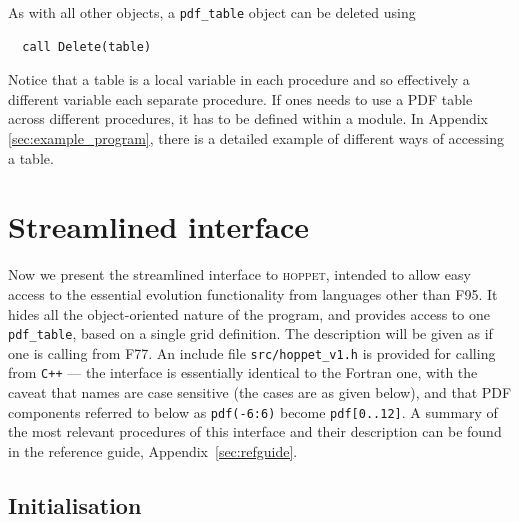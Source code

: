 \documentclass[12pt]{article}
\newcommand{\hoppet}{\textsc{hoppet}\xspace}
\newcommand{\ttt}[1]{\texttt{#1}}
\begin{document}
As with all other objects, a \ttt{pdf\_table} object can be deleted
using
\begin{lstlisting}
  call Delete(table) 
\end{lstlisting}
Notice that a table is a local variable in each procedure and so 
effectively a different variable each separate
procedure. 
%
If ones needs to use a 
PDF table across different procedures, it has to be 
defined within a module.
In Appendix \ref{sec:example_program}, 
there is a detailed example of different ways of
accessing a table. 






\section{Streamlined interface}
\label{sec:vanilla}

Now we present the streamlined interface to \hoppet,
intended to allow easy access
to the essential evolution functionality from languages other than
F95.  It hides all the object-oriented nature of the program, and
provides access to one \ttt{pdf\_table}, based on a single grid
definition. The description will be given as if one is calling from
F77. An include file \ttt{src/hoppet\_v1.h} is provided for calling
from {\tt C++} --- the interface is essentially identical to the Fortran
one, with the caveat that names are case sensitive (the cases are as
given below), and that PDF components referred to below as
\ttt{pdf(-6:6)} become \ttt{pdf[0..12]}. A summary of the
most relevant procedures of this interface 
and their description can be found 
in the reference guide, Appendix~\ref{sec:refguide}.

\subsection{Initialisation}
\label{sec:vanilla_initialisation}
\end{document}
